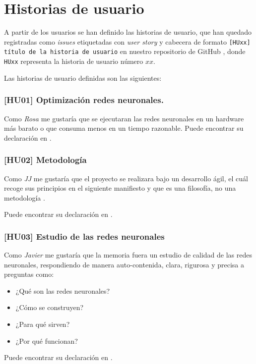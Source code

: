 \section{Historias de usuario}   \label{ch:metodología_personas_historias_de_usuario}

A partir de los usuarios se han definido las historias de usuario, que han quedado registradas 
como \textit{issues} etiquetadas con \textit{user story} y cabecera de formato
\texttt{[HUxx] título de la historia de usuario} en nuestro 
repositorio de GitHub \cite{TFG-Estudio-de-las-redes-neuronales},
 donde \texttt{HUxx} representa
la historia de usuario número $xx$.   

Las historias de usuario definidas son las siguientes: 

\subsubsection*{[HU01] Optimización redes neuronales.}\label{HU01}
    Como \textit{Rosa} me gustaría que se ejecutaran las redes neuronales en un hardware
    más barato o que consuma menos en un tiempo razonable.
Puede encontrar su declaración en \cite{TFG-Estudio-de-las-redes-neuronales-HU01}. 

\subsubsection*{ [HU02] Metodología} \label{HUO2}

Como \textit{JJ} me gustaría que el proyecto se realizara bajo un desarrollo ágil,  el cuál recoge sus principios en el siguiente manifiesto \cite{principios-manifiesto-agil} y que es una filosofía, no una metodología \cite{why-agile-is-not-a-methodology-1} \cite{why-agile-is-not-a-methodology-2}.

Puede encontrar su declaración en \cite{TFG-Estudio-de-las-redes-neuronales-HU02}.  

\subsubsection*{ [HU03] Estudio de las redes neuronales} \label{HUO3}
Como \textit{Javier} me gustaría que la memoria fuera un estudio de calidad de las redes neuronales, 
respondiendo de manera auto-contenida, clara, rigurosa y precisa a preguntas como:
\begin{itemize}
    \item ¿Qué son las redes neuronales?
    \item ¿Cómo se construyen?
    \item ¿Para qué sirven?
    \item ¿Por qué funcionan?
\end{itemize}
Puede encontrar su declaración en \cite{TFG-Estudio-de-las-redes-neuronales-HU03}.

